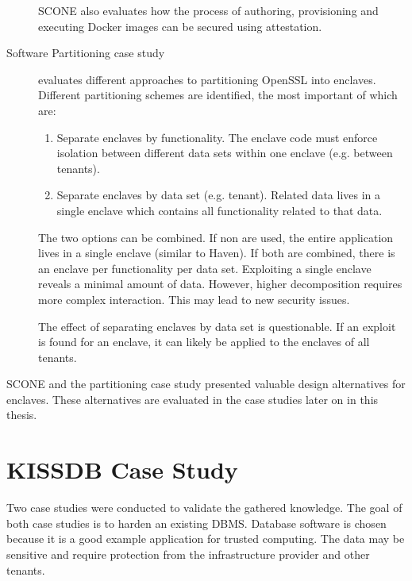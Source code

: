 \begin{description}
SCONE also evaluates how the process of authoring, provisioning and executing Docker images can be secured using attestation.\label{ID_302956960}
\item[Software Partitioning case study\cite{atamli2015securing}]\label{ID_1866621600}
evaluates different approaches to partitioning OpenSSL into enclaves.\label{ID_889806073}
Different partitioning schemes are identified, the most important of which are:\label{ID_1492497964}
\begin{enumerate}\label{ID_1557877705}
\item Separate enclaves by functionality. The enclave code must enforce isolation between different data sets within one enclave (e.g. between tenants).\label{ID_1393496068}
\item Separate enclaves by data set (e.g. tenant). Related data lives in a single enclave which contains all functionality related to that data.\label{ID_113647933}
\end{enumerate}\label{ID_372710258}
The two options can be combined. If non are used, the entire application lives in a single enclave (similar to Haven). If both are combined, there is an enclave per functionality per data set. Exploiting a single enclave reveals a minimal amount of data.\label{ID_1825195394}
However, higher decomposition requires more complex interaction.\label{ID_1925137523}
This may lead to new security issues.\label{ID_1376225601}

The effect of separating enclaves by data set is questionable.\label{ID_348412267}
If an exploit is found for an enclave, it can likely be applied to the enclaves of all tenants.\label{ID_640876370}
\end{description}\label{ID_1705591114}

SCONE and the partitioning case study presented valuable design alternatives for enclaves.\label{ID_1172520746}
These alternatives are evaluated in the case studies later on in this thesis.\label{ID_1114134055}

\chapter{KISSDB Case Study\label{ID_1828467557}\label{chapter:kissdb}}
Two case studies were conducted to validate the gathered knowledge.\label{ID_1310178450}
The goal of both case studies is to harden an existing DBMS.\label{ID_314202562}
Database software is chosen because it is a good example application for trusted computing.\label{ID_23142153}
The data may be sensitive and require protection from the infrastructure provider and other tenants.\label{ID_113918458}

